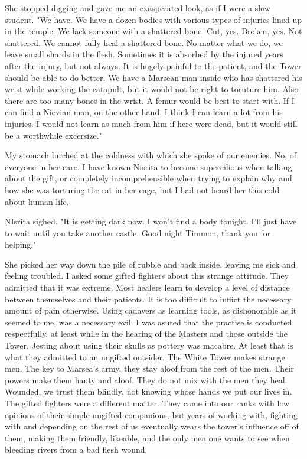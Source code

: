 \documentclass{article}
\begin{document}
She stopped digging and gave me an exasperated look, as if I were a slow student. "We have. We have a dozen bodies with various types of injuries lined up in the temple. We lack someone with a shattered bone. Cut, yes. Broken, yes. Not shattered. We cannot fully heal a shattered bone. No matter what we do, we leave small shards in the flesh. Sometimes it is absorbed by the injured years after the injury, but not always. It is hugely painful to the patient, and the Tower should be able to do better. We have a Marsean man inside who has shattered his wrist while working the catapult, but it would not be right to toruture him.  Also there are too many bones in the wrist. A femur would be best to start with. If I can find a Nievian man, on the other hand, I think I can learn a lot from his injuries. I would not learn as much from him if here were dead, but it would still be a worthwhile excersize."

My stomach lurched at the coldness with which she spoke of our enemies. No, of everyone in her care. I have known Nisrita to become supercilious when talking about the gift, or completely incomprehensible when trying to explain why and how she was torturing the rat in her cage, but I had not heard her this cold about human life. 

NIsrita sighed. "It is getting dark now. I won't find a body tonight. I'll just have to wait until you take another castle. Good night Timmon, thank you for helping."

She picked her way down the pile of rubble and back inside, leaving me sick and feeling troubled. I asked some gifted fighters about this strange attitude. They admitted that it was extreme. Most healers learn to develop a level of distance between themselves and their patients. It is too difficult to inflict the necessary amount of pain otherwise. Using cadavers as learning tools, as dishonorable as it seemed to me,  was a necessary evil. I was asured that the practise is conducted respectfully, at least while in the hearing of the Masters and those outside the Tower. Jesting about using their skulls as pottery was macabre. At least that is what they admitted to an ungifted outsider. The White Tower makes strange men. The key to Marsea's army, they stay aloof from the rest of the men. Their powers make them hauty and aloof. They do not mix with the men they heal. Wounded, we trust them blindly, not knowing whose hands we put our lives in. The gifted fighters were a different matter. They came into our ranks with low opinions of their simple ungifted companions, but years of working with, fighting with and depending on the rest of us eventually wears the tower's influence off of them, making them friendly, likeable, and the only men one wants to see when bleeding rivers from a bad flesh wound.
\end{document}
